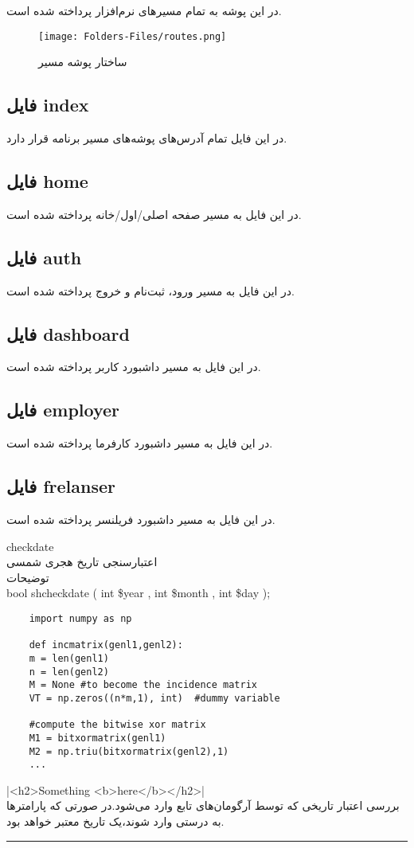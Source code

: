 در این پوشه به تمام مسیر‌های نرم‌افزار پرداخته شده است.

\begin{figure}[H]
	\texttt{[image: Folders-Files/routes.png]}
	\centering
	\caption{ساختار پوشه مسیر}
	\label{fig:folder-routes}
\end{figure}

\subsection{فایل index}
در این فایل تمام آدرس‌های پوشه‌های مسیر برنامه قرار دارد.

\subsection{فایل home}
در این فایل به مسیر صفحه اصلی/اول/خانه پرداخته شده است.

\subsection{فایل auth}
در این فایل به مسیر ورود، ثبت‌نام و خروج پرداخته شده است.

\subsection{فایل dashboard}
در این فایل به مسیر داشبورد کاربر پرداخته شده است.

\subsection{فایل employer}
در این فایل به مسیر داشبورد کارفرما پرداخته شده است.

\subsection{فایل frelanser}
در این فایل به مسیر داشبورد فریلنسر پرداخته شده است.



checkdate
\\
 اعتبارسنجی تاریخ هجری شمسی
\\
توضیحات
\\
bool shcheckdate ( int \$year , int \$month , int \$day );

\begin{verbatim}
	import numpy as np
	
	def incmatrix(genl1,genl2):
	m = len(genl1)
	n = len(genl2)
	M = None #to become the incidence matrix
	VT = np.zeros((n*m,1), int)  #dummy variable
	
	#compute the bitwise xor matrix
	M1 = bitxormatrix(genl1)
	M2 = np.triu(bitxormatrix(genl2),1) 
	...
\end{verbatim}
|<h2>Something <b>here</b></h2>|
\\
بررسی اعتبار تاریخی که توسط آرگومان‌های تابع وارد می‌شود.در صورتی که پارامترها به درستی وارد شوند،یک تاریخ معتبر خواهد بود.
\rule{\linewidth}{0.5mm}

